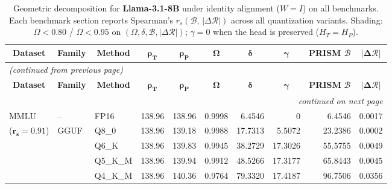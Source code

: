 \begingroup
\small
\setlength{\tabcolsep}{4pt}
\renewcommand{\arraystretch}{1.05}
\setlength{\LTcapwidth}{\textwidth}
\begin{longtable}{ll l rrrrrrr}
\caption{Geometric decomposition for \textbf{Llama-3.1-8B} under identity alignment ($W{=}I$) on all benchmarks. Each benchmark section reports Spearman's $r_s(\mathcal{B},\,|\Delta\mathcal{R}|)$ across all quantization variants. Shading: \colorbox{red!35}{$\Omega{<}0.80$} / \colorbox{red!18}{$\Omega{<}0.95$} on $(\Omega,\delta,\mathcal{B},|\Delta\mathcal{R}|)$; \colorbox{cyan!12}{$\gamma{=}0$} when the head is preserved ($H_T{=}H_P$).}\label{tab:llama_decomposition_all_bound}\\
\toprule
\multicolumn{1}{c}{\textbf{Dataset}} & \multicolumn{1}{c}{\textbf{Family}} & \multicolumn{1}{c}{\textbf{Method}} & \multicolumn{1}{c}{$\boldsymbol{\rho_T}$} & \multicolumn{1}{c}{$\boldsymbol{\rho_P}$} & \multicolumn{1}{c}{$\boldsymbol{\Omega}$} & \multicolumn{1}{c}{$\boldsymbol{\delta}$} & \multicolumn{1}{c}{$\boldsymbol{\gamma}$} & \multicolumn{1}{c}{\textbf{PRISM} $\boldsymbol{\mathcal{B}}$} & \multicolumn{1}{c}{$\boldsymbol{|\Delta\mathcal{R}|}$} \\
\midrule
\endfirsthead
\multicolumn{10}{l}{\small\itshape (continued from previous page)}\\
\toprule
\multicolumn{1}{c}{\textbf{Dataset}} & \multicolumn{1}{c}{\textbf{Family}} & \multicolumn{1}{c}{\textbf{Method}} & \multicolumn{1}{c}{$\boldsymbol{\rho_T}$} & \multicolumn{1}{c}{$\boldsymbol{\rho_P}$} & \multicolumn{1}{c}{$\boldsymbol{\Omega}$} & \multicolumn{1}{c}{$\boldsymbol{\delta}$} & \multicolumn{1}{c}{$\boldsymbol{\gamma}$} & \multicolumn{1}{c}{\textbf{PRISM} $\boldsymbol{\mathcal{B}}$} & \multicolumn{1}{c}{$\boldsymbol{|\Delta\mathcal{R}|}$} \\
\midrule
\endhead
\midrule
\multicolumn{10}{r}{\small\itshape continued on next page}\\
\endfoot
\bottomrule
\endlastfoot
MMLU & -- & FP16 & 138.96 & 138.96 & 0.9998 & 6.4546 & \cellcolor{cyan!12} $0$ & 6.4546 & 0.0017 \\
{\small ($\mathbf{r_s{=}0.91}$)} & GGUF & Q8\_0 & 138.96 & 139.18 & 0.9988 & 17.7313 & 5.5072 & 23.2386 & 0.0002 \\
 &  & Q6\_K & 138.96 & 139.83 & 0.9945 & 38.2729 & 17.3026 & 55.5755 & 0.0049 \\
 &  & Q5\_K\_M & 138.96 & 139.94 & 0.9912 & 48.5266 & 17.3177 & 65.8443 & 0.0045 \\
 &  & Q4\_K\_M & 138.96 & 140.36 & 0.9764 & 79.3320 & 17.4187 & 96.7506 & 0.0356 \\

\end{longtable}
